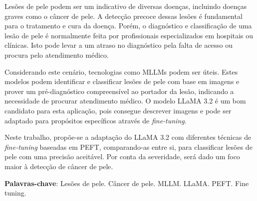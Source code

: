 \imprimircapa

\imprimirfolhaderosto*

\begin{fichacatalografica}
	
\end{fichacatalografica}



% 

\setlength{\absparsep}{18pt}
\begin{resumo}
	\SingleSpacing
	Lesões de pele podem ser um indicativo de diversas doenças, incluindo doenças graves como o câncer de pele. A detecção precoce dessas lesões é fundamental para o
	tratamento e cura da doença. Porém, o diagnóstico e classificação de uma lesão de pele é normalmente feita por profissionais especializados em hospitais ou clínicas.
	Isto pode levar a um atraso no diagnóstico pela falta de acesso ou procura pelo atendimento médico.

	Considerando este cenário, tecnologias como \acp{MLLM} podem ser úteis. Estes modelos podem identificar e classificar lesões de pele com base em imagens e prover um
	pré-diagnóstico compreensível ao portador da lesão, indicando a necessidade de procurar atendimento médico. O modelo \ac{LLaMA} 3.2 é um bom candidato para esta
	aplicação, pois consegue descrever imagens e pode ser adaptado para propósitos específicos através de \textit{fine-tuning}.

	Neste trabalho, propõe-se a adaptação do \ac{LLaMA} 3.2 com diferentes técnicas de \textit{fine-tuning} baseadas em \ac{PEFT}, comparando-as entre si, para
	classificar lesões de pele com uma precisão aceitável. Por conta da severidade, será dado um foco maior à detecção de câncer de pele.

	\textbf{Palavras-chave}: Lesões de pele. Câncer de pele. MLLM. LLaMA. PEFT. Fine tuning.
\end{resumo}

